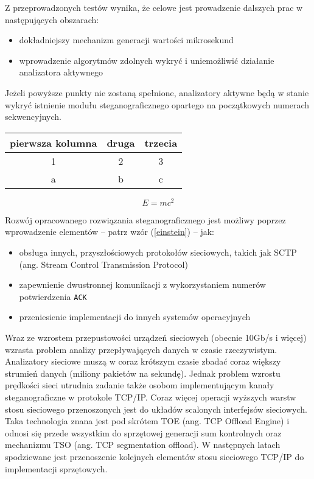 \documentclass[a4paper,12pt,twoside,openany]{report}
\newcommand{\tech}{\texttt}
\begin{document}
Z przeprowadzonych testów wynika, że celowe jest prowadzenie dalszych prac w 
następujących obszarach:
\begin{itemize}
 \item dokładniejszy mechanizm generacji wartości mikrosekund
 \item wprowadzenie algorytmów zdolnych wykryć i uniemożliwić działanie 
analizatora aktywnego
\end {itemize}

Jeżeli powyższe punkty nie zostaną spełnione, analizatory aktywne będą w stanie 
wykryć istnienie modułu steganograficznego opartego na początkowych numerach 
sekwencyjnych.

\begin{tabular}{c|cc}
pierwsza kolumna & druga & trzecia \\ \hline
1 & 2 & 3 \\
a & b & c \\
\end{tabular} 

\begin{equation}
 E = m c^2 \label{einstein}
\end{equation}

Rozwój opracowanego rozwiązania steganograficznego jest możliwy poprzez 
wprowadzenie elementów  -- patrz wzór (\ref{einstein}) -- jak:
\begin{itemize}
 \item obsługa innych, przyszłościowych protokołów sieciowych, takich jak SCTP 
(ang. Stream Control Transmission Protocol)\cite{RFC2960}
 \item zapewnienie dwustronnej komunikacji z wykorzystaniem numerów 
potwierdzenia \tech{ACK}
 \item przeniesienie implementacji do innych systemów operacyjnych
\end{itemize}

Wraz ze wzrostem przepustowości urządzeń sieciowych (obecnie 10Gb/s i więcej) 
wzrasta problem analizy przepływających danych w czasie rzeczywistym. 
Analizatory sieciowe muszą w coraz krótszym czasie zbadać coraz większy strumień 
danych (miliony pakietów na sekundę). Jednak problem wzrostu prędkości sieci 
utrudnia zadanie także osobom implementującym kanały steganograficzne w 
protokole TCP/IP. Coraz więcej operacji wyższych warstw stosu sieciowego 
przenoszonych jest do układów scalonych interfejsów sieciowych. Taka technologia 
znana jest pod skrótem TOE (ang. TCP Offload Engine) i odnosi się przede 
wszystkim do sprzętowej generacji sum kontrolnych oraz mechanizmu TSO (ang. TCP 
segmentation offload). W następnych latach spodziewane jest przenoszenie 
kolejnych elementów stosu sieciowego TCP/IP do implementacji sprzętowych.
\end{document}
